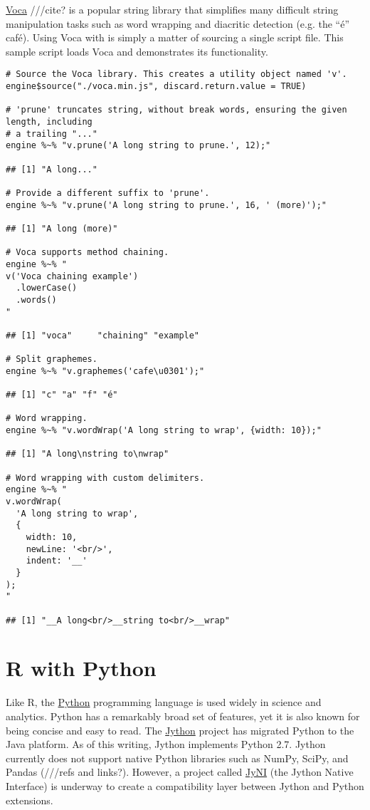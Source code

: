 \href{https://vocajs.com/}{Voca} ///cite? is a popular string library that simplifies many difficult string manipulation tasks such as word wrapping and diacritic detection (e.g. the “\'{e}” caf\'{e}). Using Voca with  is simply a matter of sourcing a single script file. This sample script loads Voca and demonstrates its functionality.

\begin{verbatim}
# Source the Voca library. This creates a utility object named 'v'.
engine$source("./voca.min.js", discard.return.value = TRUE)

# 'prune' truncates string, without break words, ensuring the given length, including
# a trailing "..."
engine %~% "v.prune('A long string to prune.', 12);"

## [1] "A long..."

# Provide a different suffix to 'prune'.
engine %~% "v.prune('A long string to prune.', 16, ' (more)');"

## [1] "A long (more)"

# Voca supports method chaining.
engine %~% "
v('Voca chaining example')
  .lowerCase()
  .words()
"

## [1] "voca"     "chaining" "example"

# Split graphemes.
engine %~% "v.graphemes('cafe\u0301');"

## [1] "c" "a" "f" "é"

# Word wrapping.
engine %~% "v.wordWrap('A long string to wrap', {width: 10});"

## [1] "A long\nstring to\nwrap"

# Word wrapping with custom delimiters.
engine %~% "
v.wordWrap(
  'A long string to wrap',
  {
    width: 10,
    newLine: '<br/>',
    indent: '__'
  }
);
"

## [1] "__A long<br/>__string to<br/>__wrap"
\end{verbatim}

\section{R with Python}

Like R, the \href{https://www.python.org/}{Python} programming language is used widely in science and analytics. Python has a remarkably broad set of features, yet it is also known for being concise and easy to read. The \href{http://www.jython.org/}{Jython} project has migrated Python to the Java platform. As of this writing, Jython implements Python 2.7. Jython currently does not support native Python libraries such as NumPy, SciPy, and Pandas (///refs and links?). However, a project called \href{http://www.jyni.org/}{JyNI} (the Jython Native Interface) is underway to create a compatibility layer between Jython and Python extensions.

